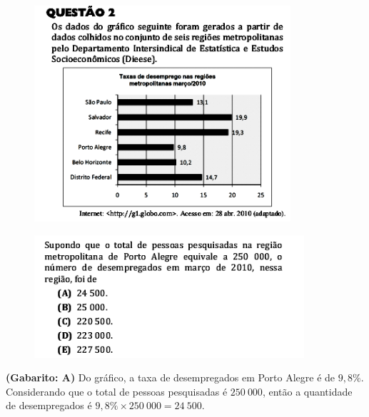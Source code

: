 \documentclass[a4paper]{article}
\begin{document}
\begin{figure}[H]
	\begin{center}
		\includegraphics[width=9.5cm]{L3Q2_1.png}
	\end{center}
\end{figure}
\begin{figure}[H]
	\begin{center}
		\includegraphics[width=10cm]{L3Q2_2.png}
	\end{center}
\end{figure}
\par\textbf{(Gabarito: A)} Do gráfico, a taxa de desempregados em Porto Alegre é de $9,8\%$. Considerando que o total de pessoas pesquisadas é $250\ 000$, então a quantidade de desempregados é $9,8\% \times 250\ 000 = 24\ 500$.
\end{document}
